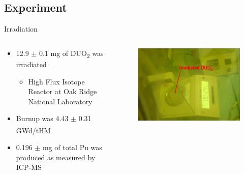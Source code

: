 \documentclass{beamer}
\newcommand{\tss}{\textsuperscript}
\newcommand{\tsbs}{\textsubscript}
\begin{document}
\subsection{Experiment}
\begin{frame}{Irradiation}
  \begin{columns}
    \begin{column}{0.5\textwidth}
      \vspace{-1cm}
      \begin{itemize}
      \item{12.9 $\pm$ 0.1 mg of DUO\tsbs{2} was irradiated}
        \begin{itemize}
        \item{High Flux Isotope Reactor at Oak Ridge National Laboratory}
        \end{itemize}
      \item{Burnup was 4.43 $\pm$ 0.31 GWd/tHM\tss{\cite{swinney2015experimental}}}
      \item{0.196 $\pm$ mg of total Pu was produced as measured by ICP-MS}
      \end{itemize}
    \end{column}
    \begin{column}{0.5\textwidth}
      \begin{figure}[H]
        \vspace*{-1cm}
        \begin{center}
	   \includegraphics[scale = 0.4]{irradiated}
	\end{center}
      \end{figure}
    \end{column}
  \end{columns}  
  \end{frame}
\end{document}
